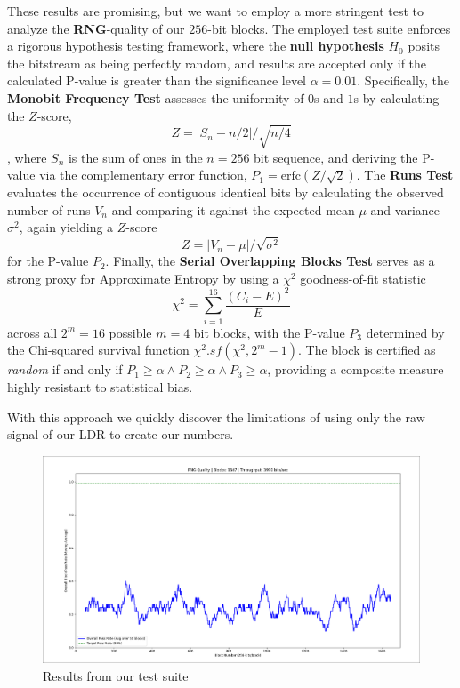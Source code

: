 These results are promising, but we want to employ a more stringent 
test to analyze the \textbf{RNG}-quality of our 
\(256\)-bit blocks.
The employed test suite enforces a rigorous hypothesis testing 
framework, where the \textbf{null hypothesis} $H_0$ posits 
the bitstream 
as being perfectly random, and results are accepted only if the 
calculated P-value is greater than the significance level 
$\alpha=0.01$. Specifically, the \textbf{Monobit Frequency Test} 
assesses the uniformity of $0$s and $1$s by calculating the $Z$-score,
$$ 
    Z = |S_n - n/2| / \sqrt{n/4}
$$
, where $S_n$ is the sum of ones 
in the $n=256$ bit sequence, and deriving the P-value via the 
complementary error function, $P_1 = \text{erfc}(Z/\sqrt{2})$. 
The \textbf{Runs Test} evaluates the occurrence of contiguous 
identical 
bits by calculating the observed number of runs $V_n$ and comparing 
it against the expected mean $\mu$ and variance $\sigma^2$, 
again yielding a $Z$-score 
$$ 
    Z = |V_n - \mu| / \sqrt{\sigma^2} 
$$ 
for the P-value $P_2$. Finally, 
the \textbf{Serial Overlapping Blocks Test} serves as a strong proxy 
for Approximate Entropy by using a $\chi^2$ goodness-of-fit 
statistic 
$$
    \chi^2 = \displaystyle\sum_{i=1}^{16} \frac{(C_i - E)^2}{E}
$$
across all $2^m=16$ possible $m=4$ bit blocks, 
with the P-value $P_3$ determined by the Chi-squared survival 
function $\chi^2.sf(\chi^2, 2^m - 1)$. The block is certified as 
\emph{random} if and only if $P_1 \geq \alpha \land P_2 \geq \alpha 
\land P_3 \geq \alpha$, providing a composite measure highly 
resistant to statistical bias.

With this approach we quickly discover the limitations of 
using only the raw signal of our LDR to create our numbers.

\begin{figure}[h]
    \centering
    \includegraphics[width=0.9\linewidth]{./images/RNG_TEST_RAW.png} 
    \caption{Results from our test suite}
    \label{fig:256_suite_2}
\end{figure}

